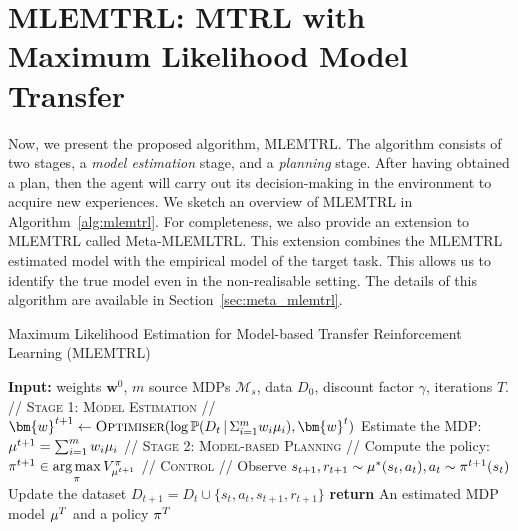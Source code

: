\section{MLEMTRL: MTRL with Maximum Likelihood Model Transfer}\label{sec:algorithms}
Now, we present the proposed algorithm, MLEMTRL. The algorithm consists of two stages, a \emph{model estimation} stage, and a \emph{planning} stage. After having obtained a plan, then the agent will carry out its decision-making in the environment to acquire new experiences. We sketch an overview of MLEMTRL in Algorithm~\ref{alg:mlemtrl}. For completeness, we also provide an extension to MLEMTRL called Meta-MLEMLTRL. This extension combines the MLEMTRL estimated model with the empirical model of the target task. This allows us to identify the true model even in the non-realisable setting. The details of this algorithm are available in Section~\ref{sec:meta_mlemtrl}.%

\begin{algorithm}[t!]
\caption{Maximum Likelihood Estimation for Model-based Transfer Reinforcement Learning (MLEMTRL)}\label{alg:mlemtrl}
\begin{algorithmic}[1]
\State \textbf{Input:} weights $\bm{w}^0$, $m$ source MDPs $\mathcal{M}_s$, data $D_0$, discount factor $\gamma$, iterations $T$.
\State\textsc{// Stage 1: Model Estimation //}
\State $\bm{w}^{t+1}\leftarrow  \textsc{Optimiser}(\log\mathbb{P}(D_t \, | \, \Sigma_{i=1}^m w_i \mdp_i), \bm{w}^t)$\label{lin:optimiser}
\State Estimate the MDP: $\mu^{t+1} = \sum_{i=1}^m w_i \mu_i$
\State\textsc{// Stage 2: Model-based Planning //}
\State Compute the policy: $\pi^{t+1} \in \underset{\pi}{\arg\max} \, V_{\mu^{t+1}}^\pi$
\State\textsc{// Control //}
\State Observe $s_{t+1}, r_{t+1} \sim \mu^{*}(s_t, a_t), a_t\sim \pi^{t+1}(s_t)$
\State Update the dataset $D_{t+1} = D_t \cup \{s_t, a_t, s_{t+1}, r_{t+1}\}$
\EndFor
\State \textbf{return} An estimated MDP model $\mu^T$ and a policy $\pi^T$
\end{algorithmic}
\end{algorithm}

